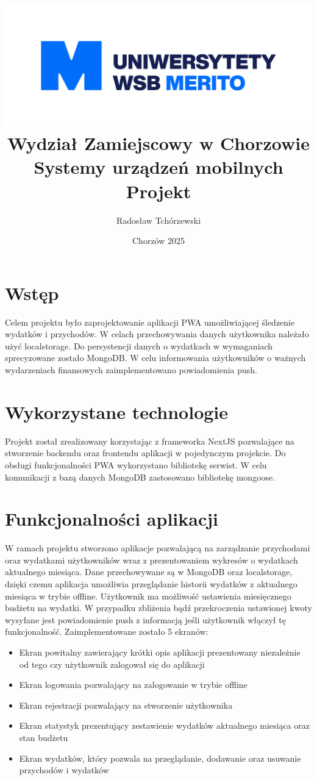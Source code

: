 \documentclass[11pt,titlepage]{article}
\title{
\centering
\includegraphics[scale=0.5]{logo/logo}\\
\textbf{Wydział Zamiejscowy w Chorzowie}\\
\vspace{1cm}
Systemy urządzeń mobilnych \\
\vspace{0.5cm}
Projekt
}
\author{Radosław Tchórzewski}
\date{Chorzów 2025}
\begin{document}
\maketitle


\newpage

\newcommand{\ww}{.25}

\section{Wstęp}
Celem projektu było zaprojektowanie aplikacji PWA umożliwiającej śledzenie wydatków i przychodów. W celach przechowywania danych użytkownika należało użyć localstorage. Do persystencji danych o wydatkach w wymaganiach sprecyzowane zostało MongoDB. W celu informowania użytkowników o ważnych wydarzeniach finansowych zaimplementowano powiadomienia push.

\section{Wykorzystane technologie}
Projekt został zrealizowany korzystając z frameworka NextJS pozwalające na stworzenie backendu oraz frontendu aplikacji w pojedynczym projekcie. Do obsługi funkcjonalności PWA wykorzystano bibliotekę serwist. W celu komunikacji z bazą danych MongoDB zastosowano bibliotekę mongoose.

\section{Funkcjonalności aplikacji}
W ramach projektu stworzono aplikacje pozwalającą na zarządzanie przychodami oraz wydatkami użytkowników wraz z prezentowaniem wykresów o wydatkach aktualnego miesiąca. Dane przechowywane są w MongoDB oraz localstorage, dzięki czemu aplikacja umożliwia przeglądanie historii wydatków z aktualnego miesiąca w trybie offline. Użytkownik ma możliwość ustawienia miesięcznego budżetu na wydatki. W przypadku zbliżenia bądź przekroczenia ustawionej kwoty wysyłane jest powiadomienie push z informacją jeśli użytkownik włączył tę funkcjonalność. 
Zaimplementowane zostało 5 ekranów:

\begin{itemize}
  \item Ekran powitalny zawierający krótki  opis aplikacji prezentowany niezależnie od tego czy użytkownik zalogował się do aplikacji
  \item Ekran logowania pozwalający na zalogowanie w trybie offline
  \item Ekran rejestracji pozwalający na stworzenie użytkownika
  \item Ekran statystyk prezentujący zestawienie wydatków aktualnego miesiąca oraz stan budżetu
  \item Ekran wydatków, który pozwala na przeglądanie, dodawanie oraz usuwanie przychodów i wydatków
\end{itemize}
\end{document}
